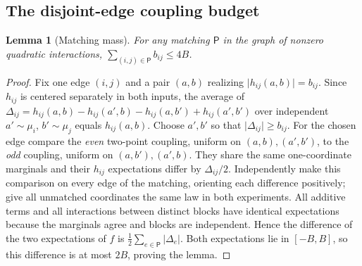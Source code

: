\documentclass[11pt,letterpaper]{article}
\newtheorem{lemma}[theorem]{Lemma}
\theoremstyle{definition}\newtheorem{definition}[theorem]{Definition}
\newcommand{\abs}[1]{\lvert #1\rvert}
\begin{document}
\subsection{The disjoint-edge coupling budget}
\begin{lemma}[Matching mass]\label{lem:matching}
For any matching $\mathsf P$ in the graph of nonzero quadratic interactions,
$\sum_{(i,j)\in\mathsf P}b_{ij}\le4B$.
\end{lemma}
\begin{proof}
Fix one edge $(i,j)$ and a pair $(a,b)$ realizing $\abs{h_{ij}(a,b)}=b_{ij}$. Since $h_{ij}$ is centered separately in both inputs, the average of
$\Delta_{ij}=h_{ij}(a,b)-h_{ij}(a',b)-h_{ij}(a,b')+h_{ij}(a',b')$
over independent $a'\sim\mu_i$, $b'\sim\mu_j$ equals $h_{ij}(a,b)$. Choose $a',b'$ so that $\abs{\Delta_{ij}}\ge b_{ij}$.
For the chosen edge compare the \emph{even} two-point coupling, uniform on $(a,b),(a',b')$, to the \emph{odd} coupling, uniform on $(a,b'),(a',b)$. They share the same one-coordinate marginals and their $h_{ij}$ expectations differ by $\Delta_{ij}/2$. Independently make this comparison on every edge of the matching, orienting each difference positively; give all unmatched coordinates the same law in both experiments. All additive terms and all interactions between distinct blocks have identical expectations because the marginals agree and blocks are independent. Hence the difference of the two expectations of $f$ is $\frac12\sum_{e\in\mathsf P}\abs{\Delta_e}$. Both expectations lie in $[-B,B]$, so this difference is at most $2B$, proving the lemma.
\end{proof}
\end{document}
